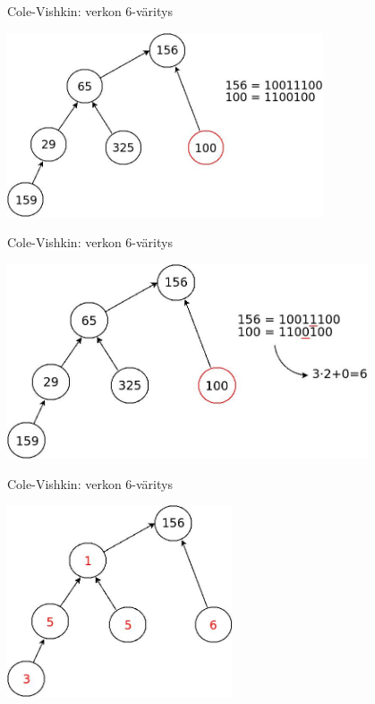 \documentclass[a4paper, 12pt, finnish]{beamer}
\begin{document}
\begin{frame}{Cole-Vishkin: verkon 6-väritys}
    \begin{center} 
        \includegraphics[width=0.7\textwidth]{Diagram6.jpeg} 
    \end{center} 
\end{frame}

\begin{frame}{Cole-Vishkin: verkon 6-väritys}
    \begin{center} 
        \includegraphics[width=0.8\textwidth]{Diagram7.jpeg} 
    \end{center} 
\end{frame}

\begin{frame}{Cole-Vishkin: verkon 6-väritys}
    \begin{center} 
        \includegraphics[width=0.5\textwidth]{Diagram8.jpeg} 
    \end{center} 
\end{frame}
\end{document}
